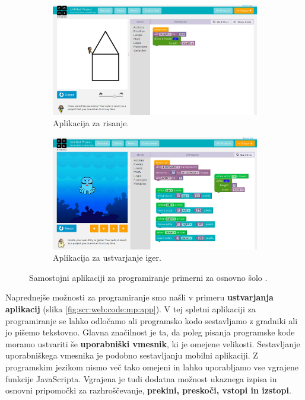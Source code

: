 \begin{figure}[h!]
  \centering
  \begin{subfigure}[]{0.45\textwidth}
    \includegraphics[width=\textwidth]{./images/sc_web/code_cs_draw.jpg}
    \caption{Aplikacija za risanje.}
  \label{fig:code:mp:draw}
\end{subfigure}
\qquad
\begin{subfigure}[]{0.45\textwidth}
  \includegraphics[width=\textwidth]{./images/sc_web/code_cs_game.jpg}
  \caption{Aplikacija za ustvarjanje iger.}
\label{fig:code:mp:game}
\end{subfigure}
\caption{Samostojni aplikaciji za programiranje primerni za
  osnovno šolo \cite{web:code.org:studio}.}
\label{fig:web:code:mp:dg}
\end{figure}

Naprednejše možnosti za programiranje smo našli v primeru
\textbf{ustvarjanja aplikacij} (slika
\ref{fig:scr:web:code:mp:app}). V tej spletni aplikaciji za
programiranje se lahko odločamo ali programsko kodo sestavljamo z
gradniki ali jo pišemo tekstovno. Glavna značilnost je ta, da poleg
pisanja programske kode moramo ustvariti še \textbf{uporabniški
  vmesnik}, ki je omejene velikosti. Sestavljanje uporabniškega
vmesnika je podobno sestavljanju mobilni aplikaciji. Z programskim
jezikom nismo več tako omejeni in lahko uporabljamo vse vgrajene
funkcije JavaScripta. Vgrajena je tudi dodatna možnost ukaznega izpisa
in osnovni pripomočki za razhroščevanje, \textbf{prekini, preskoči,
  vstopi in izstopi}.


